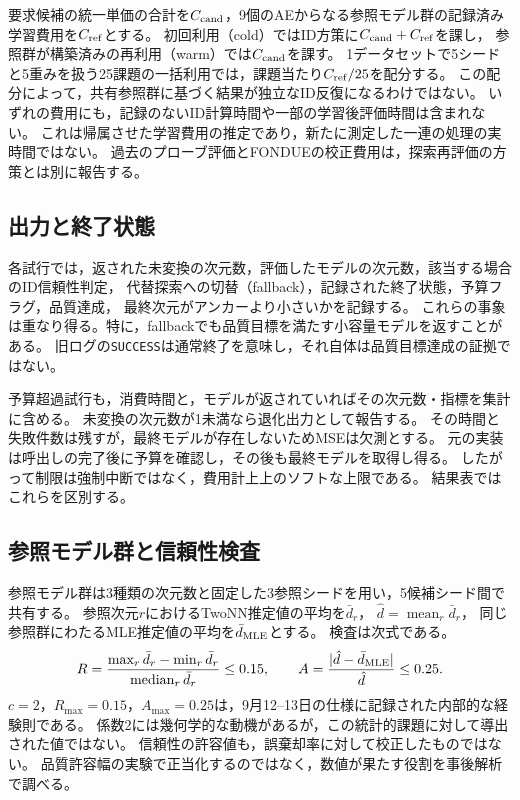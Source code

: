 \documentclass[11pt,a4paper]{ltjsarticle}
\begin{document}
要求候補の統一単価の合計を$C_{\rm cand}$，9個のAEからなる参照モデル群の記録済み学習費用を$C_{\rm ref}$とする。
初回利用（cold）ではID方策に$C_{\rm cand}+C_{\rm ref}$を課し，
参照群が構築済みの再利用（warm）では$C_{\rm cand}$を課す。
1データセットで5シードと5重みを扱う25課題の一括利用では，課題当たり$C_{\rm ref}/25$を配分する。
この配分によって，共有参照群に基づく結果が独立なID反復になるわけではない。
いずれの費用にも，記録のないID計算時間や一部の学習後評価時間は含まれない。
これは帰属させた学習費用の推定であり，新たに測定した一連の処理の実時間ではない。
過去のプローブ評価とFONDUEの校正費用は，探索再評価の方策とは別に報告する。

\subsection{出力と終了状態}\label{sec:outcomes}
各試行では，返された未変換の次元数，評価したモデルの次元数，該当する場合のID信頼性判定，
代替探索への切替（fallback），記録された終了状態，予算フラグ，品質達成，
最終次元がアンカーより小さいかを記録する。
これらの事象は重なり得る。特に，fallbackでも品質目標を満たす小容量モデルを返すことがある。
旧ログの\texttt{SUCCESS}は通常終了を意味し，それ自体は品質目標達成の証拠ではない。

予算超過試行も，消費時間と，モデルが返されていればその次元数・指標を集計に含める。
未変換の次元数が1未満なら退化出力として報告する。
その時間と失敗件数は残すが，最終モデルが存在しないためMSEは欠測とする。
元の実装は呼出しの完了後に予算を確認し，その後も最終モデルを取得し得る。
したがって制限は強制中断ではなく，費用計上上のソフトな上限である。
結果表ではこれらを区別する。

\subsection{参照モデル群と信頼性検査}\label{sec:algorithm}
参照モデル群は3種類の次元数と固定した3参照シードを用い，5候補シード間で共有する。
参照次元$r$におけるTwoNN推定値の平均を$\bar d_r$，
$\hat d=\operatorname{mean}_r\bar d_r$，
同じ参照群にわたるMLE推定値の平均を$\bar d_{\rm MLE}$とする。
検査は次式である。
\begin{equation}
 R=\frac{\max_r\bar d_r-\min_r\bar d_r}{\operatorname{median}_r\bar d_r}
 \le0.15,\qquad
 A=\frac{|\hat d-\bar d_{\rm MLE}|}{\hat d}\le0.25.
 \label{eq:checks}
\end{equation}
$c=2$，$R_{\max}=0.15$，$A_{\max}=0.25$は，9月12--13日の仕様に記録された内部的な経験則である。
係数2には幾何学的な動機があるが，この統計的課題に対して導出された値ではない。
信頼性の許容値も，誤棄却率に対して校正したものではない。
品質許容幅の実験で正当化するのではなく，数値が果たす役割を事後解析で調べる。
\end{document}
